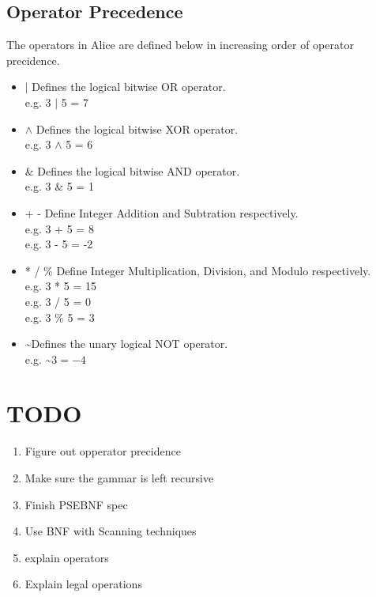 \documentclass[a4wide, 11pt]{article}
\newcommand{\tab}{\hspace*{2em}}
\begin{document}
\subsection{Operator Precedence}
The operators in Alice are defined below in increasing order of operator precidence.

\begin{itemize}
	\item
	$|$ Defines the logical bitwise OR operator. 
	\\ \tab e.g. 3 $|$ 5 = 7
	\item
	$\land$ Defines the logical bitwise XOR operator. 
	\\ \tab e.g. 3 $\land$ 5 = 6
	\item
	$\&$ Defines the logical bitwise AND operator. 
	\\ \tab e.g. 3 $\&$ 5 = 1
	\item
	+ - Define Integer Addition and Subtration respectively. 
	\\ \tab e.g. 3 + 5 = 8 \\ \tab e.g. 3 - 5 = -2
	\item
	* / \% Define Integer Multiplication, Division, and Modulo respectively. 
	\\ \tab e.g. 3 * 5 = 15 \\ \tab e.g. 3 / 5 = 0 \\ \tab e.g. 3 \% 5 = 3
	\item
	\textasciitilde  Defines the unary logical NOT operator.
	\\ \tab e.g. \textasciitilde$ 3 = -4$
\end{itemize}

\section{TODO}

\begin{enumerate}

    \item
    Figure out opperator precidence
    
    \item
    Make sure the gammar is left recursive
    
    \item
    Finish PSEBNF spec

    \item
    Use BNF with Scanning techniques 
    
    \item
     explain operators

    \item
    Explain legal operations    
    
    
\end{enumerate}
\end{document}
